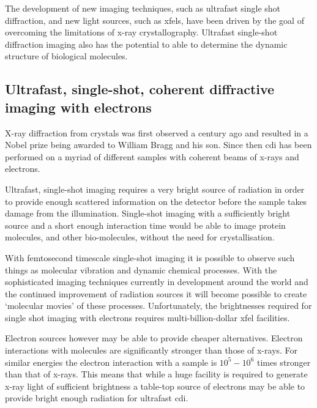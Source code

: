The development of new imaging techniques, such as ultrafast single shot diffraction, and new light sources, such as \glspl{xfel}, have been driven by the goal of overcoming the limitations of x-ray crystallography. Ultrafast single-shot diffraction imaging also has the potential to able to determine the dynamic structure of biological molecules.


\subsection{Ultrafast, single-shot, coherent diffractive imaging with electrons}

X-ray diffraction from crystals was first observed a century ago\cite{bragg_x-rays_1912} and resulted in a Nobel prize being awarded to William Bragg and his son. Since then \gls{cdi} has been performed on a myriad of different samples with coherent beams of x-rays and electrons.

Ultrafast, single-shot imaging requires a very bright source of radiation in order to provide enough scattered information on the detector before the sample takes damage from the illumination\cite{henderson_potential_1995}. Single-shot imaging with a sufficiently bright source and a short enough interaction time would be able to image protein molecules, and other bio-molecules, without the need for crystallisation\cite{neutze_potential_2000}.

With femtosecond timescale single-shot imaging it is possible to observe such things as molecular vibration and dynamic chemical processes\cite{zewail_4d_2006}. With the sophisticated imaging techniques currently in development around the world and the continued improvement of radiation sources it will become possible to create `molecular movies'\cite{dwyer_femtosecond_2006} of these processes. Unfortunately, the brightnesses required for single shot imaging with electrons requires multi-billion-dollar \gls{xfel} facilities.

Electron sources however may be able to provide cheaper alternatives. Electron interactions with molecules are significantly stronger than those of x-rays. For similar energies the electron interaction with a sample is $10^5-10^6$ times stronger than that of x-rays\cite{sciaini_femtosecond_2011}. This means that while a huge facility is required to generate x-ray light of sufficient brightness a table-top source of electrons may be able to provide bright enough radiation for ultrafast \gls{cdi}.

